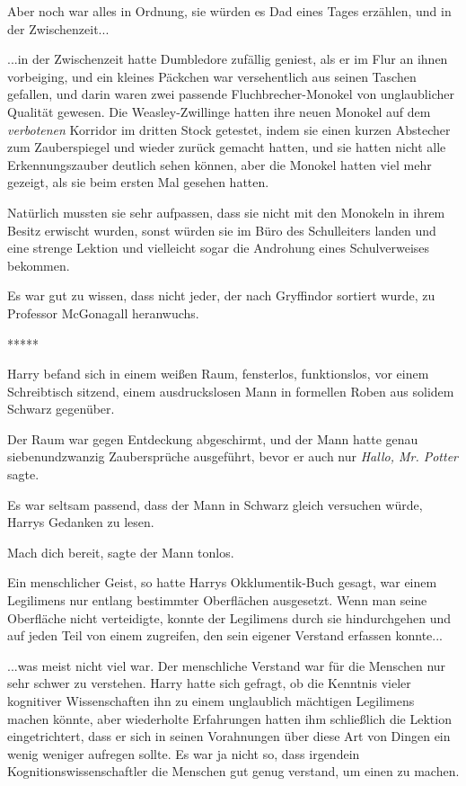 Aber noch war alles in Ordnung, sie würden es Dad eines Tages erzählen, und in
der Zwischenzeit...

...in der Zwischenzeit hatte Dumbledore zufällig geniest, als er im Flur an
ihnen vorbeiging, und ein kleines Päckchen war versehentlich aus seinen Taschen
gefallen, und darin waren zwei passende Fluchbrecher-Monokel von unglaublicher
Qualität gewesen. Die Weasley-Zwillinge hatten ihre neuen Monokel auf dem
\glqq{} \emph{verbotenen}\grqq{} Korridor im dritten Stock getestet, indem sie
einen kurzen Abstecher zum Zauberspiegel und wieder zurück gemacht hatten, und
sie hatten nicht alle Erkennungszauber deutlich sehen können, aber die Monokel
hatten viel mehr gezeigt, als sie beim ersten Mal gesehen hatten.

Natürlich mussten sie sehr aufpassen, dass sie nicht mit den Monokeln in ihrem
Besitz erwischt wurden, sonst würden sie im Büro des Schulleiters landen und
eine strenge Lektion und vielleicht sogar die Androhung eines Schulverweises
bekommen.

Es war gut zu wissen, dass nicht jeder, der nach Gryffindor sortiert wurde, zu
Professor McGonagall heranwuchs.

\begin{center}*****\end{center}

Harry befand sich in einem weißen Raum, fensterlos, funktionslos, vor einem
Schreibtisch sitzend, einem ausdruckslosen Mann in formellen Roben aus solidem
Schwarz gegenüber.

Der Raum war gegen Entdeckung abgeschirmt, und der Mann hatte genau
siebenundzwanzig Zaubersprüche ausgeführt, bevor er auch nur \emph{\glqq{}
Hallo, Mr. Potter\grqq{}} sagte.

Es war seltsam passend, dass der Mann in Schwarz gleich versuchen würde, Harrys
Gedanken zu lesen.

\glqq{}Mach dich bereit\grqq{}, sagte der Mann tonlos.

Ein menschlicher Geist, so hatte Harrys Okklumentik-Buch gesagt, war einem
Legilimens nur entlang bestimmter Oberflächen ausgesetzt. Wenn man seine
Oberfläche nicht verteidigte, konnte der Legilimens durch sie hindurchgehen und
auf jeden Teil von einem zugreifen, den sein eigener Verstand erfassen konnte...

...was meist nicht viel war. Der menschliche Verstand war für die Menschen nur
sehr schwer zu verstehen. Harry hatte sich gefragt, ob die Kenntnis vieler
kognitiver Wissenschaften ihn zu einem unglaublich mächtigen Legilimens machen
könnte, aber wiederholte Erfahrungen hatten ihm schließlich die Lektion
eingetrichtert, dass er sich in seinen Vorahnungen über diese Art von Dingen ein
wenig weniger aufregen sollte. Es war ja nicht so, dass irgendein
Kognitionswissenschaftler die Menschen gut genug verstand, um einen zu machen.

